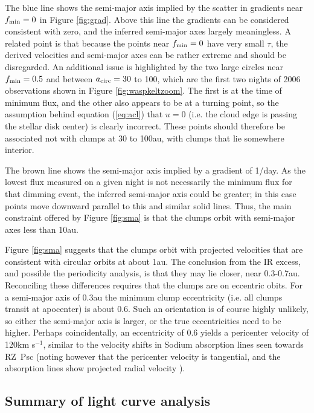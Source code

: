 \documentclass[]{rsos}
\begin{document}
The blue line shows the semi-major axis implied by the scatter in gradients near
$f_{\rm min}=0$ in Figure \ref{fig:grad}. Above this line the gradients can be considered
consistent with zero, and the inferred semi-major axes largely meaningless. A related
point is that because the points near $f_{\rm min}=0$ have very small $\tau$, the derived
velocities and semi-major axes can be rather extreme and should be disregarded. An
additional issue is highlighted by the two large circles near $f_{\rm min}=0.5$ and
between $a_{\rm circ}=30$ to 100, which are the first two nights of 2006 observations
shown in Figure \ref{fig:waspkeltzoom}. The first is at the time of minimum flux, and the
other also appears to be at a turning point, so the assumption behind equation
(\ref{eq:acl}) that $u=0$ (i.e. the cloud edge is passing the stellar disk center) is
clearly incorrect. These points should therefore be associated not with clumps at 30 to
100au, with clumps that lie somewhere interior.

The brown line shows the semi-major axis implied by a gradient of 1/day. As the lowest
flux measured on a given night is not necessarily the minimum flux for that dimming
event, the inferred semi-major axis could be greater; in this case points move downward
parallel to this and similar solid lines. Thus, the main constraint offered by Figure
\ref{fig:sma} is that the clumps orbit with semi-major axes less than 10au.

Figure \ref{fig:sma} suggests that the clumps orbit with projected velocities that are
consistent with circular orbits at about 1au. The conclusion from the IR excess, and
possible the periodicity analysis, is that they may lie closer, near
0.3-0.7au. Reconciling these differences requires that the clumps are on eccentric
obits. For a semi-major axis of 0.3au the minimum clump eccentricity (i.e. all clumps
transit at apocenter) is about 0.6. Such an orientation is of course highly unlikely, so
either the semi-major axis is larger, or the true eccentricities need to be
higher. Perhaps coincidentally, an eccentricity of 0.6 yields a pericenter velocity of
120km s$^{-1}$, similar to the velocity shifts in Sodium absorption lines seen towards
RZ~Psc (noting however that the pericenter velocity is tangential, and the absorption
lines show projected radial velocity \cite{2013Ap.....56..453P}).

\subsection{Summary of light curve analysis}\label{ss:wheresum}
\end{document}
